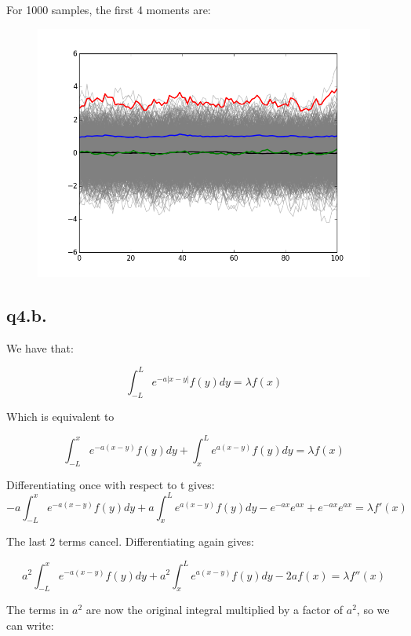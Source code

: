 \documentclass[11pt]{article} %
\begin{document}
For 1000 samples, the first 4 moments are:
\begin{figure}[h!]
	\centering
		\includegraphics[scale = 0.5]{q4a.png}
\end{figure}

\subsection{q4.b.}
We have that:

\begin{equation}
	\int^{L}_{-L}e^{-a|x-y|}f(y)dy = \lambda f(x)
\end{equation}

Which is equivalent to

\begin{equation}
	\int^{x}_{-L}e^{-a(x-y)}f(y)dy + \int^{L}_{x}e^{a(x-y)}f(y)dy = \lambda f(x)
\end{equation}

Differentiating once with respect to t gives:
\begin{equation}
	-a\int^{x}_{-L}e^{-a(x-y)}f(y)dy + a\int^{L}_{x}e^{a(x-y)}f(y)dy - e^{-ax}e^{ax} + e^{-ax}e^{ax} = \lambda f'(x)
\end{equation}

The last 2 terms cancel. Differentiating again gives:

\begin{equation}
	a^{2}\int^{x}_{-L}e^{-a(x-y)}f(y)dy + a^{2}\int^{L}_{x}e^{a(x-y)}f(y)dy - 2af(x)  = \lambda f''(x)
\end{equation}

The terms in $a^{2}$ are now the original integral multiplied by a factor of $a^{2}$, so we can write:
\end{document}
